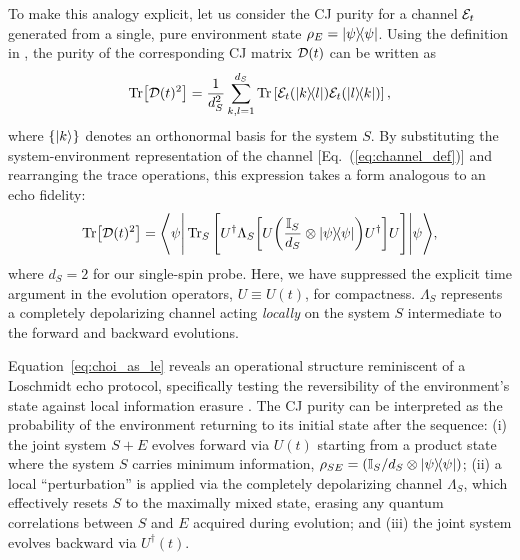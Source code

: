 \documentclass[letterpaper,superscriptaddress,aps,pra,nolongbibliography,showpacs,floatfix,dvipsnames,10pt,twocolumn]{revtex4-2}
\begin{document}
To make this analogy explicit, let us consider the CJ purity
for a channel $\mathcal{E}_t$ generated from a single, pure environment
state $\rho_E = \dyad{\psi}$. Using the definition in
, the purity of the corresponding CJ
matrix $\mathcal{D}(t)$ can be written as
\begin{equation}
\Tr[\mcD(t)^2] =
\frac{1}{d_S^2} \sum_{k,l=1}^{d_S}
\Tr\left[ \mcE_t(\dyad{k}{l}) \mcE_t(\dyad{l}{k}) \right],
\end{equation}
where $\{\ket{k}\}$ denotes an orthonormal basis for the system $S$.
By substituting the system-environment representation of the channel
[Eq.~(\ref{eq:channel_def})] and rearranging the trace operations,
this expression takes a form analogous to an echo fidelity:
\begin{equation}\label{eq:choi_as_le}
\Tr[\mcD(t)^2] = \Bigg\langle\psi\Bigg|
\Tr_S\Bigg[
U^\dagger \Lambda_S \bqty{
U \pqty{\frac{\mathbb{I}_S}{d_S} \otimes \dyad{\psi} } U^\dagger
} U
\Bigg]
\Bigg|\psi\Bigg\rangle,
\end{equation}
where $d_S=2$ for our single-spin probe. 
Here, we have suppressed the
explicit time argument in the evolution operators, $U \equiv U(t)$, for
compactness. $\Lambda_S$ represents a completely depolarizing channel 
acting \textit{locally} on the system $S$ intermediate to the forward
and backward evolutions.

Equation~\eqref{eq:choi_as_le} reveals an operational structure
reminiscent of a Loschmidt echo protocol, specifically testing the
reversibility of the environment's state against local information
erasure . The CJ purity can be interpreted as the probability of the
environment returning to its initial state after the sequence:
(i) the joint system $S+E$ evolves forward via $U(t)$ starting from
a product state where the system $S$ carries minimum information,
$\rho_{SE} = (\mathbb{I}_S/d_S \otimes \dyad{\psi})$;
(ii) a local ``perturbation'' is applied via the completely depolarizing channel
$\Lambda_S$, which effectively resets $S$ to the maximally mixed state,
erasing any quantum correlations between $S$ and $E$ acquired during evolution; 
and (iii) the joint system evolves backward via $U^\dagger(t)$. 
\end{document}
